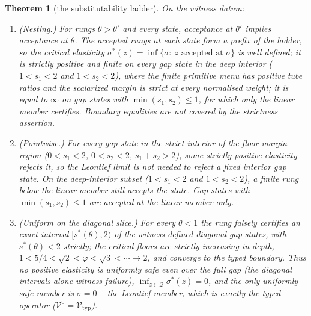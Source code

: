 \documentclass[preprint,11pt,authoryear]{elsarticle}
\newtheorem{theorem}{Theorem}
\theoremstyle{definition}
\theoremstyle{remark}
\newcommand{\Vtyp}{\mathcal{V}_{\mathrm{typ}}}
\newcommand{\Q}{\mathcal{Q}}
\begin{document}
\begin{theorem}[the substitutability ladder]\label{thm:ladder}
On the witness datum:
\begin{enumerate}[label=\textup{(\roman*)},leftmargin=2em]
\item \textup{(Nesting.)} For rungs $\theta>\theta'$ and every state, acceptance at $\theta'$ implies acceptance at $\theta$. The accepted rungs at each state form a prefix of the ladder, so the \emph{critical elasticity} $\sigma^*(z)=\inf\{\sigma:\ z\text{ accepted at }\sigma\}$ is well defined; it is strictly positive and finite on every gap state in the deep interior ($1<s_1<2$ and $1<s_2<2$), where the finite primitive menu has positive tube ratios and the scalarized margin is strict at every normalised weight; it is equal to $\infty$ on gap states with $\min(s_1,s_2)\le1$, for which only the linear member certifies. Boundary equalities are not covered by the strictness assertion.
\item \textup{(Pointwise.)} For every gap state in the strict interior of the floor-margin region ($0<s_1<2$, $0<s_2<2$, $s_1+s_2>2$), some strictly positive elasticity rejects it, so the Leontief limit is not needed to reject a fixed interior gap state. On the deep-interior subset ($1<s_1<2$ and $1<s_2<2$), a finite rung below the linear member still accepts the state. Gap states with $\min(s_1,s_2)\le1$ are accepted at the linear member only.
\item \textup{(Uniform on the diagonal slice.)} For every $\theta<1$ the rung falsely certifies an exact interval $[s^*(\theta),2)$ of the witness-defined diagonal gap states, with $s^*(\theta)<2$ strictly; the critical floors are strictly increasing in depth, $1<5/4<\sqrt2<\varphi<\sqrt3<\cdots\to2$, and converge to the typed boundary. Thus no positive elasticity is uniformly safe even over the full gap (the diagonal intervals alone witness failure), $\inf_{z\in\Q}\sigma^*(z)=0$, and the only uniformly safe member is $\sigma=0$ -- the Leontief member, which is exactly the typed operator ($\mathcal V^{0}=\Vtyp$).
\end{enumerate}
\end{theorem}
\end{document}

